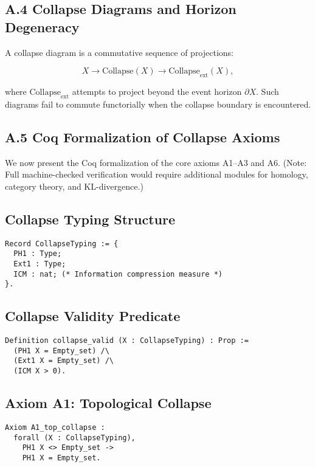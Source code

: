 \documentclass[11pt]{article}
\begin{document}
\subsection*{A.4 Collapse Diagrams and Horizon Degeneracy}

A collapse diagram is a commutative sequence of projections:

\[
X \longrightarrow \mathrm{Collapse}(X) \longrightarrow \mathrm{Collapse}_{\mathrm{ext}}(X),
\]

where \( \mathrm{Collapse}_{\mathrm{ext}} \) attempts to project beyond the event horizon \( \partial X \). Such diagrams fail to commute functorially when the collapse boundary is encountered.

\subsection*{A.5 Coq Formalization of Collapse Axioms}

We now present the Coq formalization of the core axioms A1–A3 and A6.  
(Note: Full machine-checked verification would require additional modules for homology, category theory, and KL-divergence.)

\subsection*{Collapse Typing Structure}

\begin{lstlisting}
Record CollapseTyping := {
  PH1 : Type;
  Ext1 : Type;
  ICM : nat; (* Information compression measure *)
}.
\end{lstlisting}

\subsection*{Collapse Validity Predicate}

\begin{lstlisting}
Definition collapse_valid (X : CollapseTyping) : Prop :=
  (PH1 X = Empty_set) /\
  (Ext1 X = Empty_set) /\
  (ICM X > 0).
\end{lstlisting}

\subsection*{Axiom A1: Topological Collapse}

\begin{lstlisting}
Axiom A1_top_collapse :
  forall (X : CollapseTyping),
    PH1 X <> Empty_set ->
    PH1 X = Empty_set.
\end{lstlisting}
\end{document}
